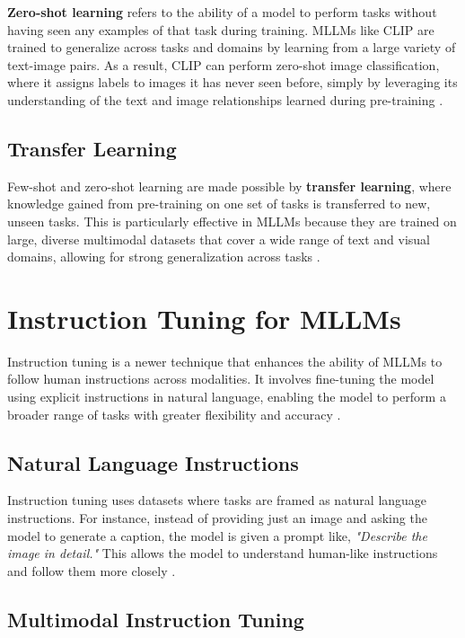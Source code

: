 \textbf{Zero-shot learning} refers to the ability of a model to perform tasks without having seen any examples of that task during training. MLLMs like CLIP are trained to generalize across tasks and domains by learning from a large variety of text-image pairs. As a result, CLIP can perform zero-shot image classification, where it assigns labels to images it has never seen before, simply by leveraging its understanding of the text and image relationships learned during pre-training \cite{ZeroShotLearning2024}.

\subsection{Transfer Learning}

Few-shot and zero-shot learning are made possible by \textbf{transfer learning}, where knowledge gained from pre-training on one set of tasks is transferred to new, unseen tasks. This is particularly effective in MLLMs because they are trained on large, diverse multimodal datasets that cover a wide range of text and visual domains, allowing for strong generalization across tasks \cite{TransferLearning2024}.

\section{Instruction Tuning for MLLMs}

Instruction tuning is a newer technique that enhances the ability of MLLMs to follow human instructions across modalities. It involves fine-tuning the model using explicit instructions in natural language, enabling the model to perform a broader range of tasks with greater flexibility and accuracy \cite{InstructionTuning2024}.

\subsection{Natural Language Instructions}

Instruction tuning uses datasets where tasks are framed as natural language instructions. For instance, instead of providing just an image and asking the model to generate a caption, the model is given a prompt like, \textit{"Describe the image in detail."} This allows the model to understand human-like instructions and follow them more closely \cite{NaturalLanguageInstructions2024}.

\subsection{Multimodal Instruction Tuning}

